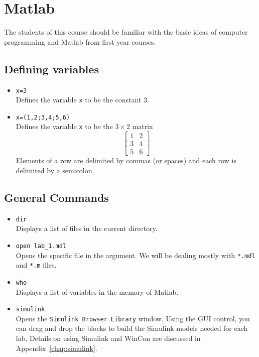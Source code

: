\chapter{Matlab}\label{chap:MATLAB}

The students of this course should be familiar with the basic ideas of
computer programming and Matlab from first year courses.

\section{Defining variables}

\begin{itemize}
\item \verb|x=3|\\
Defines the variable \verb|x| to be the constant 3.
\item \verb|x=(1,2;3,4;5,6)|\\
Defines the variable \verb|x| to be the $3 \times 2$ matrix
\begin{equation*}
\begin{bmatrix}1&2\\3&4\\5&6\end{bmatrix}
\end{equation*}
Elements of a row are delimited by commas (or spaces) and each row is
delimited by a semicolon.
\end{itemize}

\section{General Commands}

\begin{itemize}
\item \verb|dir|\\
Displays a list of files in the current directory.
\item  \verb|open lab_1.mdl|\\
Opens the specific file in the argument. We will be dealing mostly with
\verb|*.mdl| and \verb|*.m| files.
\item \verb|who|\\
Displays a list of variables in the memory of \textsf{Matlab}.
\item \verb|simulink|\\
Opens the \verb|Simulink Browser Library| window.  Using the GUI control, you
can drag and drop the blocks to build the \textsf{Simulink} models needed for
each lab.  Details on using \textsf{Simulink} and WinCon are discussed in
Appendix~\ref{chap:simulink}.
\end{itemize}

